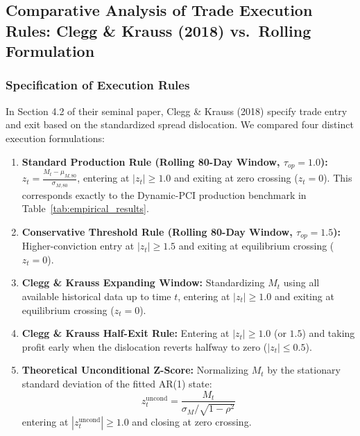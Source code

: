 \documentclass[11pt, a4paper]{article}
\begin{document}
\subsection{Comparative Analysis of Trade Execution Rules: Clegg \& Krauss (2018) vs.\ Rolling Formulation}
\label{sec:trade_rules}

\subsubsection{Specification of Execution Rules}
In Section 4.2 of their seminal paper, Clegg \& Krauss (2018) specify trade entry and exit based on the standardized spread dislocation. We compared four distinct execution formulations:
\begin{enumerate}
    \item \textbf{Standard Production Rule (Rolling 80-Day Window, $\tau_{op}=1.0$):} $z_t = \frac{M_t - \mu_{M, 80}}{\sigma_{M, 80}}$, entering at $|z_t| \ge 1.0$ and exiting at zero crossing ($z_t = 0$). This corresponds exactly to the Dynamic-PCI production benchmark in Table~\ref{tab:empirical_results}.
    \item \textbf{Conservative Threshold Rule (Rolling 80-Day Window, $\tau_{op}=1.5$):} Higher-conviction entry at $|z_t| \ge 1.5$ and exiting at equilibrium crossing ($z_t = 0$).
    \item \textbf{Clegg \& Krauss Expanding Window:} Standardizing $M_t$ using all available historical data up to time $t$, entering at $|z_t| \ge 1.0$ and exiting at equilibrium crossing ($z_t = 0$).
    \item \textbf{Clegg \& Krauss Half-Exit Rule:} Entering at $|z_t| \ge 1.0$ (or $1.5$) and taking profit early when the dislocation reverts halfway to zero ($|z_t| \le 0.5$).
    \item \textbf{Theoretical Unconditional Z-Score:} Normalizing $M_t$ by the stationary standard deviation of the fitted AR(1) state:
    \begin{equation}
        z_t^{\text{uncond}} = \frac{M_t}{\sigma_M / \sqrt{1 - \rho^2}}
    \end{equation}
    entering at $|z_t^{\text{uncond}}| \ge 1.0$ and closing at zero crossing.
\end{enumerate}
\end{document}
